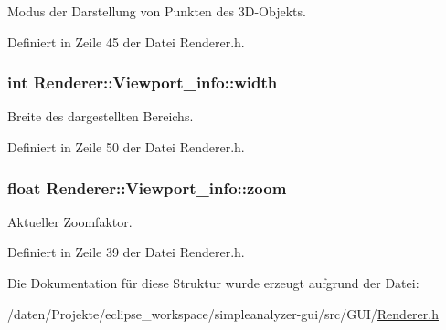 Modus der Darstellung von Punkten des 3\-D-\/\-Objekts. 



Definiert in Zeile 45 der Datei Renderer.\-h.

\hypertarget{structRenderer_1_1Viewport__info_af0617337cfe95f9d5a21420335474bea}{
\subsubsection[{width}]{\setlength{\rightskip}{0pt plus 5cm}int Renderer\-::\-Viewport\-\_\-info\-::width}}\label{structRenderer_1_1Viewport__info_af0617337cfe95f9d5a21420335474bea}


Breite des dargestellten Bereichs. 



Definiert in Zeile 50 der Datei Renderer.\-h.

\hypertarget{structRenderer_1_1Viewport__info_a9bbc5e50fed7334fb237e620e6080e5e}{
\subsubsection[{zoom}]{\setlength{\rightskip}{0pt plus 5cm}float Renderer\-::\-Viewport\-\_\-info\-::zoom}}\label{structRenderer_1_1Viewport__info_a9bbc5e50fed7334fb237e620e6080e5e}


Aktueller Zoomfaktor. 



Definiert in Zeile 39 der Datei Renderer.\-h.



Die Dokumentation für diese Struktur wurde erzeugt aufgrund der Datei\-:\begin{DoxyCompactItemize}
\item 
/daten/\-Projekte/eclipse\-\_\-workspace/simpleanalyzer-\/gui/src/\-G\-U\-I/\hyperlink{simpleanalyzer-gui_2src_2GUI_2Renderer_8h}{Renderer.\-h}\end{DoxyCompactItemize}
